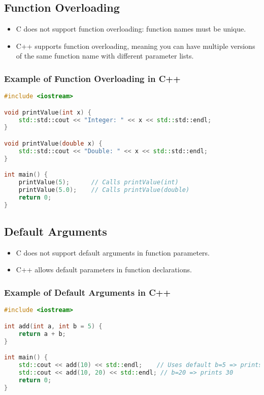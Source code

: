 \documentclass[a4paper,12pt]{article}
\begin{document}
\subsection{Function Overloading}
\begin{itemize}
    \item C does not support function overloading: function names must be unique.
    \item C++ supports function overloading, meaning you can have multiple versions of the same function name with different parameter lists.
\end{itemize}

\subsubsection{Example of Function Overloading in C++}
\begin{lstlisting}[language=C++]
#include <iostream>

void printValue(int x) {
    std::std::cout << "Integer: " << x << std::std::endl;
}

void printValue(double x) {
    std::std::cout << "Double: " << x << std::std::endl;
}

int main() {
    printValue(5);      // Calls printValue(int)
    printValue(5.0);    // Calls printValue(double)
    return 0;
}
\end{lstlisting}

\subsection{Default Arguments}
\begin{itemize}
    \item C does not support default arguments in function parameters.
    \item C++ allows default parameters in function declarations.
\end{itemize}

\subsubsection{Example of Default Arguments in C++}
\begin{lstlisting}[language=C++]
#include <iostream>

int add(int a, int b = 5) {
    return a + b;
}

int main() {
    std::cout << add(10) << std::endl;    // Uses default b=5 => prints 15
    std::cout << add(10, 20) << std::endl; // b=20 => prints 30
    return 0;
}
\end{lstlisting}
\end{document}
